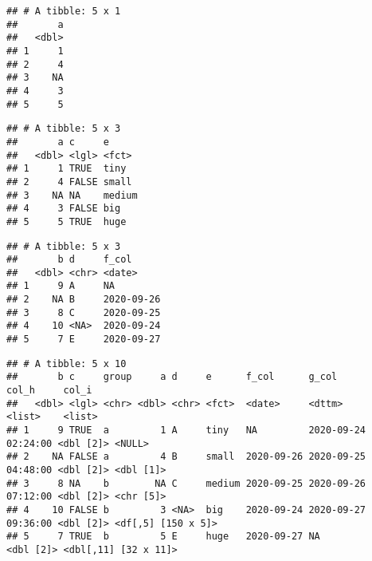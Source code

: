 \documentclass[
]{book}
\newenvironment{Shaded}{\begin{snugshade}}{\end{snugshade}}
\newcommand{\KeywordTok}[1]{\textcolor[rgb]{0.13,0.29,0.53}{\textbf{#1}}}
\newcommand{\NormalTok}[1]{#1}
\newcommand{\OperatorTok}[1]{\textcolor[rgb]{0.81,0.36,0.00}{\textbf{#1}}}
\newcommand{\StringTok}[1]{\textcolor[rgb]{0.31,0.60,0.02}{#1}}
\begin{document}
\begin{verbatim}
## # A tibble: 5 x 1
##       a
##   <dbl>
## 1     1
## 2     4
## 3    NA
## 4     3
## 5     5
\end{verbatim}

\begin{Shaded}
\end{Shaded}

\begin{verbatim}
## # A tibble: 5 x 3
##       a c     e     
##   <dbl> <lgl> <fct> 
## 1     1 TRUE  tiny  
## 2     4 FALSE small 
## 3    NA NA    medium
## 4     3 FALSE big   
## 5     5 TRUE  huge
\end{verbatim}

\begin{Shaded}
\end{Shaded}

\begin{verbatim}
## # A tibble: 5 x 3
##       b d     f_col     
##   <dbl> <chr> <date>    
## 1     9 A     NA        
## 2    NA B     2020-09-26
## 3     8 C     2020-09-25
## 4    10 <NA>  2020-09-24
## 5     7 E     2020-09-27
\end{verbatim}

\begin{Shaded}
\end{Shaded}

\begin{verbatim}
## # A tibble: 5 x 10
##       b c     group     a d     e      f_col      g_col               col_h     col_i               
##   <dbl> <lgl> <chr> <dbl> <chr> <fct>  <date>     <dttm>              <list>    <list>              
## 1     9 TRUE  a         1 A     tiny   NA         2020-09-24 02:24:00 <dbl [2]> <NULL>              
## 2    NA FALSE a         4 B     small  2020-09-26 2020-09-25 04:48:00 <dbl [2]> <dbl [1]>           
## 3     8 NA    b        NA C     medium 2020-09-25 2020-09-26 07:12:00 <dbl [2]> <chr [5]>           
## 4    10 FALSE b         3 <NA>  big    2020-09-24 2020-09-27 09:36:00 <dbl [2]> <df[,5] [150 x 5]>  
## 5     7 TRUE  b         5 E     huge   2020-09-27 NA                  <dbl [2]> <dbl[,11] [32 x 11]>
\end{verbatim}
\end{document}

